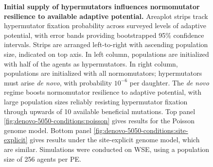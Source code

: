 \begin{figure}[h]
  \begin{minipage}{\textwidth}
    \caption{%
      \textbf{Initial supply of hypermutators influences normomutator resilience to available adaptive potential.}
      \footnotesize
      Areaplot strips track hypermutator fixation probability across surveyed levels of adaptive potential, with error bands providing bootstrapped 95\% confidence intervals.
      Strips are arranged left-to-right with ascending population size, indicated on top axis.
      In left column, populations are initialized with half of the agents as hypermutators.
      In right column, populations are initialized with all normomutators; hypermutators must arise \textit{de novo}, with probability $10^{-6}$ per daughter.
      The \textit{de novo} regime boosts normomutator resilience to adaptive potential, with large population sizes reliably resisting hypermutator fixation through upwards of 10 available beneficial mutations.
      Top panel \ref{fig:denovo-5050-conditions:poisson} gives results for the Poisson genome model.
      Bottom panel \ref{fig:denovo-5050-conditions:site-explicit} gives results under the site-explicit genome model, which are similar.
      Simulations were conducted on WSE, using a population size of 256 agents per PE.
    }
    \label{fig:denovo-5050-conditions}
  \end{minipage}
\end{figure}
